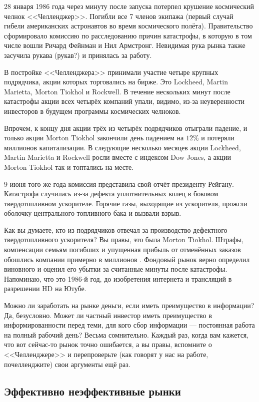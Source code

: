 28 января 1986 года через минуту после запуска потерпел крушение 
космический челнок <<Челленджер>>. Погибли все 7 членов экипажа (первый случай 
гибели американских астронавтов во время космического полёта). Правительство 
сформировало комиссию по расследованию причин катастрофы, в которую в том числе 
вошли Ричард Фейнман и Нил Армстронг. Невидимая рука рынка также засучила 
рукава (рукав?) и принялась за работу. 

В постройке <<Челленджера>> принимали участие четыре крупных подрядчика, акции 
которых торговались на бирже. Это Lockheed, Martin Marietta, Morton Tiokhol и 
Rockwell. В течение нескольких минут после катастрофы акции всех четырёх 
компаний упали, видимо, из-за неуверенности инвесторов в будущем программы 
космических челноков.

Впрочем, к концу дня акции трёх из четырёх подрядчиков отыграли падение, и 
только акции Morton Tiokhol закончили день падением на $12\%$ и потеряли 
 миллионов капитализации. В следующие несколько месяцев акции 
Lockheed, Martin Marietta и Rockwell росли вместе с индексом Dow Jones, а акции 
Morton Tiokhol так и топтались на месте.

9 июня того же года комиссия представила свой отчёт президенту Рейгану. 
Катастрофа случилась из-за дефекта уплотнительных колец в боковом 
твердотопливном ускорителе. Горячие газы, выходящие из ускорителя, прожгли 
оболочку центрального топливного бака и вызвали взрыв.

Как вы думаете, кто из подрядчиков отвечал за производство дефектного 
твердотопливного ускорителя? Вы правы, это была Morton Tiokhol. Штрафы, 
компенсации семьям погибших и упущенная прибыль от отменённых заказов обошлись 
компании примерно в  миллионов \cite{maloney2003complexity}. 
Фондовый рынок верно определил виновного и оценил его убытки за считанные минуты 
после катастрофы. Напоминаю, что это 1986-й год, до изобретения интернета и 
трансляций в разрешении HD на Ютубе.

Можно ли заработать на рынке деньги, если иметь преимущество в информации? Да,
безусловно. Может ли частный инвестор иметь преимущество в информированности 
перед теми, для кого сбор информации --- постоянная работа на полный рабочий 
день? Весьма сомнительно. Каждый раз, когда вам кажется, что вот сейчас-то рынок
точно ошибается, а вы правы, вспомните о <<Челленджере>> и перепроверьте (как 
говорят у нас на работе, почелленджите) свои аргументы ещё раз.

\subsection{Эффективно неэффективные рынки}

